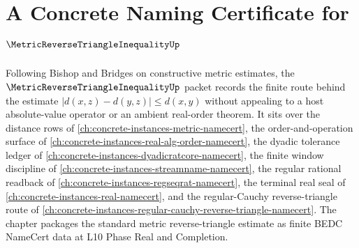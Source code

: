 \chapter{A Concrete Naming Certificate for $\MetricReverseTriangleInequalityUp$}
\label{ch:concrete-instances-metric-reverse-triangle-inequality-namecert}

Following Bishop and Bridges on constructive metric estimates, the $\MetricReverseTriangleInequalityUp$ packet records the finite route behind the estimate $|d(x,z)-d(y,z)| \leq d(x,y)$ without appealing to a host absolute-value operator or an ambient real-order theorem. It sits over the distance rows of \autoref{ch:concrete-instances-metric-namecert}, the order-and-operation surface of \autoref{ch:concrete-instances-real-alg-order-namecert}, the dyadic tolerance ledger of \autoref{ch:concrete-instances-dyadicratcore-namecert}, the finite window discipline of \autoref{ch:concrete-instances-streamname-namecert}, the regular rational readback of \autoref{ch:concrete-instances-regseqrat-namecert}, the terminal real seal of \autoref{ch:concrete-instances-real-namecert}, and the regular-Cauchy reverse-triangle route of \autoref{ch:concrete-instances-regular-cauchy-reverse-triangle-namecert}. The chapter packages the standard metric reverse-triangle estimate as finite BEDC NameCert data at L10 Phase Real and Completion.

